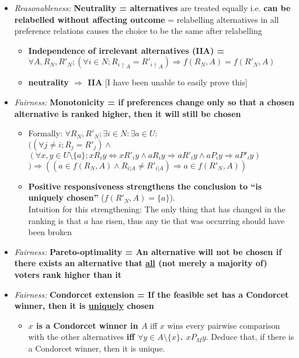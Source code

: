 \documentclass[20pt,a4paper,landscape]{extarticle}
\begin{document}
\begin{flushleft}
\begin{itemize}
\begin{itemize}
    \end{itemize}
\item \textit{Reasonableness:} \textbf{Neutrality = alternatives} are treated equally i.e. \textbf{can be relabelled without affecting outcome} = relabelling alternatives in all preference relations causes the choice to be the same after relabelling
    \begin{itemize}
    \item \textbf{Independence of irrelevant alternatives (IIA) = $\forall A, R_N, R'_N; (\forall i \in N; {R_{i}}_{\restriction A} = {R'_{i}}_{\restriction A}) \Rightarrow f(R_N, A) = f(R'_N, A)$}
    \item \textbf{neutrality $\Rightarrow$ IIA} [I have been unable to easily prove this]
    \end{itemize}
\item \textit{Fairness:} \textbf{Monotonicity = if preferences change only so that a chosen alternative is ranked higher, then it will still be chosen}
    \begin{itemize}
    \item Formally: $\forall R_N, R'_N; \exists i \in N: \exists a \in U:$\\
$((\forall j \neq i; R_j = R'_j) \land$\\
$(\forall x, y \in U \setminus \{a\}; xR_iy \Leftrightarrow xR'_iy \land aR_iy \Rightarrow aR'_iy \land aP_iy \Rightarrow aP'_iy)$\\
$)\Rightarrow ((a \in f(R_N, A) \land R_{i|A} \neq R'_{i|A}) \Rightarrow a \in f(R'_N, A))$
    \item \textbf{Positive responsiveness strengthens the conclusion to ``is uniquely chosen''} ($f(R'_N, A) = \{a\}$).\\
    Intuition for this strengthening: The only thing that has changed in the ranking is that $a$ has risen, thus any tie that was occurring should have been broken
    \end{itemize}
\item \textit{Fairness:} \textbf{Pareto-optimality = An alternative will not be chosen if there exists an alternative that \underline{all} (not merely a majority of) voters rank higher than it}
\item \textit{Fairness:} \textbf{Condorcet extension = If the feasible set has a Condorcet winner, then it is \underline{uniquely} chosen}
    \begin{itemize}
        \item \textbf{$x$ is a Condorcet winner in $A$} iff $x$ wins every pairwise comparison with the other alternatives \textbf{iff $\forall y \in A \setminus \{x\}$. $x P_M y$}. Deduce that, if there is a Condorcet winner, then it is unique.

\end{itemize}
\end{itemize}
\end{flushleft}
\end{document}
